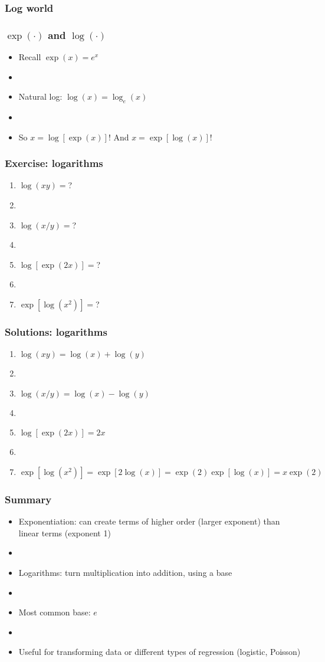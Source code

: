 \documentclass[11pt]{beamer}
\newcommand{\myframe}[1]{\begin{frame} \frametitle{#1}}
\begin{document}
\myframe{Log world}

\end{frame}

\myframe{$\exp(\cdot)$ and $\log(\cdot)$}
\begin{itemize}
\item Recall $\exp(x) = e^x$
\item[]
\item Natural log: $\log (x) = \log_e(x)$
\item[]
\item So $x = \log [\exp(x)]$! And $x = \exp[\log(x)]$!
\end{itemize}
\end{frame}

\myframe{Exercise: logarithms}
\begin{enumerate}
\item $\log(xy) = $?
\item[]
\item $\log(x/y) = $?
\item[]
\item $\log[\exp(2x)] = $?
\item[]
\item $\exp[\log(x^2)] = $?
\end{enumerate}
\end{frame}

\myframe{Solutions: logarithms}
\begin{enumerate}
\item $\log(xy) = \log(x) + \log(y)$
\item[]
\item $\log(x/y) = \log(x) - \log(y)$
\item[]
\item $\log[\exp(2x)] = 2x$
\item[]
\item $\exp[\log(x^2)] = \exp[2\log(x)] = \exp(2)\exp[\log(x)] = x\exp(2)$
\end{enumerate}
\end{frame}

\myframe{Summary}
\begin{itemize}
\item Exponentiation: can create terms of higher order (larger exponent) than linear terms (exponent 1)
\item[]
\item Logarithms: turn multiplication into addition, using a base
\item[]
\item Most common base: $e$
\item[]
\item Useful for transforming data or different types of regression (logistic, Poisson)
\end{itemize}
\end{frame}
\end{document}
